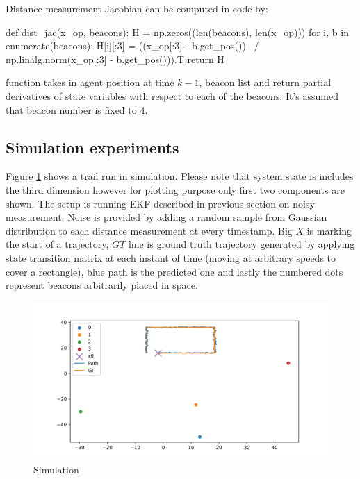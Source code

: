 Distance measurement Jacobian can be computed in code by:

\begin{minipage}{\linewidth}
\begin{python}
def dist_jac(x_op, beacons):
    H = np.zeros((len(beacons), len(x_op)))
    for i, b in enumerate(beacons):
        H[i][:3] = ((x_op[:3] - b.get_pos()) \
            / np.linalg.norm(x_op[:3] - b.get_pos())).T
    return H
\end{python}
\end{minipage}
function takes in agent position at time $k-1$, beacon list and return partial derivatives of state variables with respect to each of the beacons. It's assumed that beacon number is fixed to 4.

\subsection{Simulation experiments}

Figure \ref{fig:sim} shows a trail run in simulation. Please note that system state is includes the third dimension however for plotting purpose only first two components are shown. The setup is running EKF described in previous section on noisy measurement. Noise is provided by adding a random sample from Gaussian distribution to each distance measurement at every timestamp. Big $X$ is marking the start of a trajectory, $GT$ line is ground truth trajectory generated by applying state transition matrix at each instant of time (moving at arbitrary speeds to cover a rectangle), blue path is the predicted one and lastly the numbered dots represent beacons arbitrarily placed in space.
\begin{figure}[H]
    \includegraphics[width=\linewidth]{figures/sim.png}
    \caption{Simulation}
    \label{fig:sim}
\end{figure}

